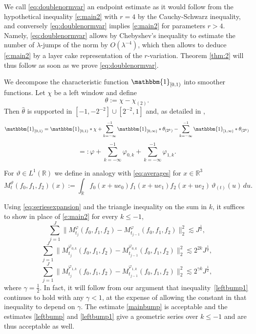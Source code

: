 \documentclass[12pt,reqno]{amsart}
\theoremstyle{plain}
\theoremstyle{definition}
\numberwithin{equation}{section}
\newcommand{\R}{{\mathbb R}}
\begin{document}
We call  \eqref{eq:doublenormvar} an endpoint estimate as it would follow from the hypothetical
inequality \eqref{e:main2} with $r=4$ by the Cauchy-Schwarz inequality, and conversely
\eqref{eq:doublenormvar} implies \eqref{e:main2} for parameters $r>4$.
Namely, \eqref{eq:doublenormvar} allows by Chebyshev's inequality to estimate the number of 
$\lambda$-jumps of the norm by $O(\lambda^{-4})$, which then allows to deduce \eqref{e:main2} by a layer cake representation of the $r$-variation. 
Theorem \ref{thm:2} will thus follow as soon as we prove \eqref{eq:doublenormvar}.





We decompose the characteristic function $\mathbbm{1}_{[0,1)}$ into smoother functions.
Let $\chi$ be a left window and define  
\[{\theta}:={\chi}-{\chi}_{(2)}.\]
Then $\widehat{\theta}$ is supported in $[-1,-2^{-2}]\cup [2^{-2},1]$ and, as detailed
in \cite[Section 2.4]{MR3904183},
\[
\mathbbm{1}_{[0,1)} = \mathbbm{1}_{[0,1)}\ast\chi + 
\sum_{k=-\infty}^{-1} \mathbbm{1}_{[0,\infty)}\ast\theta_{(2^k)}
-\sum_{k=-\infty}^{-1} \mathbbm{1}_{[1,\infty)}\ast\theta_{(2^k)}
\]
\begin{equation}\label{eq:seriesexpansion}
=: \varphi+ \sum_{k=-\infty}^{-1} \varphi_{0,k}+ \sum_{k=-\infty}^{-1}\varphi_{1,k}.
\end{equation}




For  $\vartheta\in L^1(\R)$  we define in analogy with \eqref{eq:averages} for $x \in \R^3$
\begin{equation*}%
M_{t}^\vartheta(f_0,f_1,f_2)(x) :=  \int_{\R} f_0(x+ue_0) f_1(x+ue_1) f_2(x+ue_2)\, \vartheta_{(t)}(u)\,du.
\end{equation*}

Using \eqref{eq:seriesexpansion} and  the triangle inequality on the sum in $k$,
it suffices to show in place of
\eqref{e:main2} for every $k\le -1$, 
\begin{equation}\label{mainbump} \sum_{j=1}^{J} \|M^{\varphi}_{t_j}(f_0,f_1,f_2) - M^{\varphi}_{t_{j-1}}(f_0,f_1,f_2)\|_{2}^2  \lesssim J^{\frac 12} ,\end{equation}
\begin{equation}\label{leftbump}
\sum_{j=1}^{J} \| M^{\varphi_{0,k}}_{t_j}(f_0,f_1,f_2) - M^{\varphi_{0,k}}_{t_{j-1}}(f_0,f_1,f_2)\|_{2}^2  \lesssim 2^{2k} J^{\frac 12}, \end{equation}
\begin{equation}\label{leftbump1}
\sum_{j=1}^{J} \| M^{\varphi_{1,k}}_{t_j}(f_0,f_1,f_2) - M^{\varphi_{1,k}}_{t_{j-1}}(f_0,f_1,f_2)\|_{2}^2  \lesssim 2^{\gamma k} J^{\frac 12}, \end{equation}
where $\gamma =\frac{1}{2}$. In fact, it will follow from our argument that inequality~\eqref{leftbump1} continues to hold with any $\gamma<1$, at the expense of allowing the constant in that inequality to depend on $\gamma$.
The estimate \eqref{mainbump} is acceptable and the estimates \eqref{leftbump} and
\eqref{leftbump1} give a geometric series over $k\leq -1$ and are thus acceptable as well.
 
\end{document}
